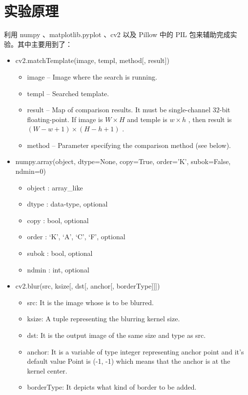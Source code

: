 \documentclass[11pt]{ctexart}
\begin{document}
\section{实验原理}

利用 numpy 、matplotlib.pyplot 、cv2 以及 Pillow 中的 PIL 包来辅助完成实验。其中主要用到了：

\begin{itemize}
    \item cv2.matchTemplate(image, templ, method[, result])
    \begin{itemize}
        \item image – Image where the search is running.
        \item templ – Searched template. 
        \item result – Map of comparison results. It must be single-channel $32$-bit floating-point. If image is $W \times H$ and temple is $w \times h$ , then result is $(W-w+1) \times (H-h+1)$ .
        \item method – Parameter specifying the comparison method (see below).
    \end{itemize}
    \item numpy.array(object, dtype=None, copy=True, order='K', subok=False, ndmin=0)
    \begin{itemize}
        \item object : array\_like
        \item dtype : data-type, optional
        \item copy : bool, optional
        \item order : {‘K’, ‘A’, ‘C’, ‘F’}, optional
        \item subok : bool, optional
        \item ndmin : int, optional
    \end{itemize}
    \item cv2.blur(src, ksize[, dst[, anchor[, borderType]]])
    \begin{itemize}
        \item src: It is the image whose is to be blurred.
        \item ksize: A tuple representing the blurring kernel size.
        \item dst: It is the output image of the same size and type as src.
        \item anchor: It is a variable of type integer representing anchor point and it’s default value Point is (-1, -1) which means that the anchor is at the kernel center.
        \item borderType: It depicts what kind of border to be added.

\end{itemize}
\end{itemize}
\end{document}
